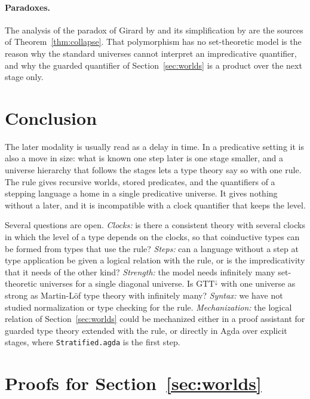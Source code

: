 \documentclass[acmsmall,nonacm,screen]{acmart}
\newcommand{\agda}[1]{\texttt{#1}}
\begin{document}
\paragraph{Paradoxes.}
The analysis of the paradox of Girard by \citet{Coquand1986} and its simplification by
\citet{Hurkens1995} are the sources of Theorem~\ref{thm:collapse}. That polymorphism has no
set-theoretic model \citep{Reynolds1984} is the reason why the standard universes cannot
interpret an impredicative quantifier, and why the guarded quantifier of
Section~\ref{sec:worlds} is a product over the next stage only.

\section{Conclusion}

The later modality is usually read as a delay in time. In a predicative setting it is also
a move in size: what is known one step later is one stage smaller, and a universe hierarchy
that follows the stages lets a type theory say so with one rule. The rule gives recursive
worlds, stored predicates, and the quantifiers of a stepping language a home in a single
predicative universe. It gives nothing without a later, and it is incompatible with a clock
quantifier that keeps the level.

Several questions are open. \emph{Clocks:} is there a consistent theory with several clocks
in which the level of a type depends on the clocks, so that coinductive types can be formed
from types that use the rule? \emph{Steps:} can a language without a step at type
application be given a logical relation with the rule, or is the impredicativity that it
needs of the other kind? \emph{Strength:} the model needs infinitely many set-theoretic
universes for a single diagonal universe. Is $\mathrm{GTT}^{\downarrow}$ with one universe
as strong as Martin-L\"of type theory with infinitely many? \emph{Syntax:} we have not
studied normalization or type checking for the rule. \emph{Mechanization:} the logical
relation of Section~\ref{sec:worlds} could be mechanized either in a proof assistant for
guarded type theory extended with the rule, or directly in Agda over explicit stages, where
\agda{Stratified.agda} is the first step.




\appendix

\section{Proofs for Section~\ref{sec:worlds}}\label{app:ft}
\end{document}
